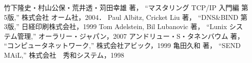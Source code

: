 \documentclass[a4j,titlepage]{jarticle}
\begin{document}
\begin{thebibliography}{9} 
    竹下隆史・村山公保・荒井透・苅田幸雄 著，
    ``マスタリング TCP/IP 入門編 第5版,''
    株式会社 オーム社，2004．
    Paul Albitz, Cricket Liu 著，
    ``DNS&BIND 第3版,''
    日経印刷株式会社，1999
    Tom Adelstein, Bil Lubanovic 著，
    ``Lunix システム管理,''
    オーラリー・ジャパン，2007
    アンドリュー・S・タネンバウム 著，
    ``コンピュータネットワーク,''
    株式会社アビック，1999
    亀田久和 著，
    ``SEND MAiL,''
    株式会社　秀和システム，1998 
\end{thebibliography}
\end{document}
